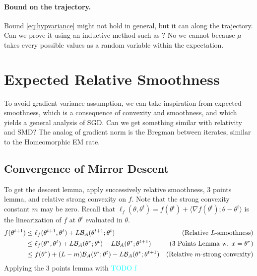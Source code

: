 \documentclass{article}
\newcommand{\TODO}[1]{\textcolor{cyan}{TODO #1}}
\newcommand{\logpart}{A}
\newcommand{\bregman}{\cB_\logpart}
\newcommand{\natp}{\theta}
\begin{document}
\paragraph{Bound on the trajectory.}
Bound \eqref{eq:hypvariance} might not hold in general, but it can along the trajectory. Can we prove it using an inductive method such as \citet[Appendix A]{lacoste2012simpler}?
No we cannot because $\mu$ takes every possible values as a random variable within the expectation.

\section{Expected Relative Smoothness}
To avoid gradient variance assumption, we can take inspiration from expected smoothness, which is a consequence of convexity and smoothness, and which yields a general analysis of SGD. Can we get something similar with relativity and SMD? 
The analog of gradient norm is the Bregman between iterates, similar to the Homeomorphic EM rate. 



\subsection{Convergence of Mirror Descent}
To get the descent lemma, apply successively relative smoothness, 3 points lemma, and relative strong convexity on $f$. Note that the strong convexity constant $m$ may be zero. Recall that $\ell_f(\natp, \natp^{t}) = f(\natp^t) + \langle \nabla f (\natp^t) ; \natp - \natp^t \rangle $ is the linearization of $f$ at $\natp^t$ evaluated in $\natp$. 
\begin{align}
	f(\natp^{t+1}) 
	&\leq \ell_f(\natp^{t+1}, \natp^{t})  + L \bregman(\natp^{t+1}; \natp^{t})
	& \text{(Relative $L$-smoothness)} \\
	& \leq \ell_f(\natp^{*}, \natp^{t})  + L \bregman(\natp^{*}; \natp^{t}) -L \bregman(\natp^{*}; \natp^{t+1}) 
	& \text{(3 Points Lemma w. $x=\natp^*$)} \\
	& \leq f(\natp^*) + (L - m) \bregman(\natp^{*}; \natp^{t}) -L \bregman(\natp^{*}; \natp^{t+1}) 
	& \text{(Relative $m$-strong convexity)}
\end{align}
Applying the 3 points lemma with \TODO{f}
\end{document}
